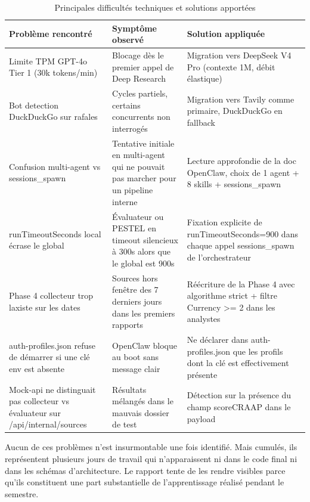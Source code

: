 \documentclass[12pt,a4paper,openany]{report}
\begin{document}
\begin{table}[H]
  \centering
  \caption{Principales difficultés techniques et solutions apportées}
  \label{tab:difficultes}
  \small
  \begin{tabularx}{\linewidth}{YYY}
    \toprule
    \textbf{Problème rencontré} & \textbf{Symptôme observé} & \textbf{Solution appliquée} \\
    \midrule
    Limite TPM GPT-4o Tier 1 (30k tokens/min) & Blocage dès le premier appel de Deep Research & Migration vers DeepSeek V4 Pro (contexte 1M, débit élastique) \\
    Bot detection DuckDuckGo sur rafales & Cycles partiels, certains concurrents non interrogés & Migration vers Tavily comme primaire, DuckDuckGo en fallback \\
    Confusion multi-agent vs sessions\_spawn & Tentative initiale en multi-agent qui ne pouvait pas marcher pour un pipeline interne & Lecture approfondie de la doc OpenClaw, choix de 1 agent + 8 skills + sessions\_spawn \\
    runTimeoutSeconds local écrase le global & Évaluateur ou PESTEL en timeout silencieux à 300s alors que le global est 900s & Fixation explicite de runTimeoutSeconds=900 dans chaque appel sessions\_spawn de l'orchestrateur \\
    Phase 4 collecteur trop laxiste sur les dates & Sources hors fenêtre des 7 derniers jours dans les premiers rapports & Réécriture de la Phase 4 avec algorithme strict + filtre Currency >= 2 dans les analystes \\
    auth-profiles.json refuse de démarrer si une clé env est absente & OpenClaw bloque au boot sans message clair & Ne déclarer dans auth-profiles.json que les profils dont la clé est effectivement présente \\
    Mock-api ne distinguait pas collecteur vs évaluateur sur /api/internal/sources & Résultats mélangés dans le mauvais dossier de test & Détection sur la présence du champ scoreCRAAP dans le payload \\
    \bottomrule
  \end{tabularx}
\end{table}

Aucun de ces problèmes n'est insurmontable une fois identifié. Mais cumulés, ils représentent plusieurs jours de travail qui n'apparaissent ni dans le code final ni dans les schémas d'architecture. Le rapport tente de les rendre visibles parce qu'ils constituent une part substantielle de l'apprentissage réalisé pendant le semestre.
\end{document}
